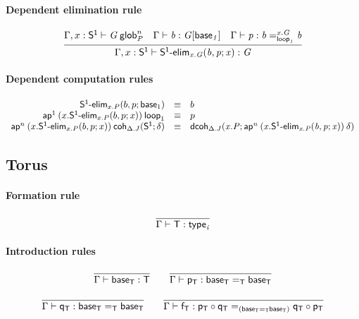 \paragraph{Dependent elimination rule}

\[
\infer{\ofglob{\Gamma,x:\dsd{S^1}}{\dsd{S^1\text{-}elim}_{x.G}(b, p; x)}{G}}
{\wfglob{\Gamma,x:\dsd{S^1}}{G}{n}{P} &
  \ofglob{\Gamma}{b}{G[\base{1}]} &
  \ofglob{\Gamma}{p}{\dhomj{x.G}{b}{b}{\lp{1}}}}
\]

\paragraph{Dependent computation rules}

\[
\begin{array}{rcl}
\mathsf{S^1\text{-}elim}_{x.P}(b, p; \mathsf{base}_{1}) & \equiv & b \\
\mathsf{ap}^{1} \: {(x.\mathsf{S^1\text{-}elim}_{x.P}(b, p; x))} \: {\mathsf{loop}_{1}} & \equiv & p\\
\mathsf{ap}^{n} \: {(x.\mathsf{S^1\text{-}elim}_{x.P}(b, p; x))} \: {\mathsf{coh}_{\Delta.J} \mathit{(\mathsf{S^1};\delta)}} & \equiv &
\mathsf{dcoh}_{\Delta.J} \mathit{(x.P;\mathsf{ap}^{n} \: {(x.\mathsf{S^1\text{-}elim}_{x.P}(b, p; x))} \: {\delta})}
\\
\end{array}
\]

\subsection{Torus}

\paragraph{Formation rule}

\[
\infer{\ofglob\Gamma{\dsd{T}}{\typ i}}{}
\]

\paragraph{Introduction rules}
\[
\begin{array}{c}
\infer{\ofglob{\Gamma}{\baseT}{\dsd{T}}}{}
\qquad
\infer{\ofglob{\Gamma}{\pT}{\homj{\dsd{T}}{\baseT}{\baseT}}}{}
\\\\
\infer{\ofglob{\Gamma}{\qT}{\homj{\dsd{T}}{\baseT}{\baseT}}}{}
\qquad
\infer{\ofglob{\Gamma}{\fT}{\homj{(\homj{\dsd{T}}{\baseT}{\baseT})}
    {\pT\circ\qT}{\qT\circ\pT}}}{}
\end{array}
\]

